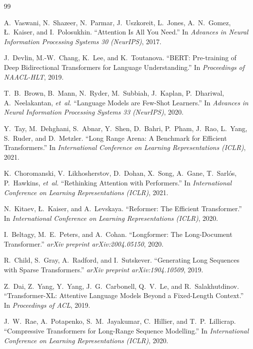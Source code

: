 \documentclass[12pt,a4paper,oneside]{book}
\begin{document}
\begin{thebibliography}{99}

A.~Vaswani, N.~Shazeer, N.~Parmar, J.~Uszkoreit, L.~Jones, A.~N.~Gomez, Ł.~Kaiser,
  and I.~Polosukhin.
``Attention Is All You Need.''
In \textit{Advances in Neural Information Processing Systems 30 (NeurIPS)}, 2017.

J.~Devlin, M.-W.~Chang, K.~Lee, and K.~Toutanova.
``BERT: Pre-training of Deep Bidirectional Transformers for Language Understanding.''
In \textit{Proceedings of NAACL-HLT}, 2019.

T.~B.~Brown, B.~Mann, N.~Ryder, M.~Subbiah, J.~Kaplan, P.~Dhariwal, A.~Neelakantan,
  \textit{et~al.}
``Language Models are Few-Shot Learners.''
In \textit{Advances in Neural Information Processing Systems 33 (NeurIPS)}, 2020.

Y.~Tay, M.~Dehghani, S.~Abnar, Y.~Shen, D.~Bahri, P.~Pham, J.~Rao, L.~Yang, S.~Ruder,
  and D.~Metzler.
``Long Range Arena: A Benchmark for Efficient Transformers.''
In \textit{International Conference on Learning Representations (ICLR)}, 2021.

K.~Choromanski, V.~Likhosherstov, D.~Dohan, X.~Song, A.~Gane, T.~Sarlós, P.~Hawkins,
  \textit{et~al.}
``Rethinking Attention with Performers.''
In \textit{International Conference on Learning Representations (ICLR)}, 2021.

N.~Kitaev, Ł.~Kaiser, and A.~Levskaya.
``Reformer: The Efficient Transformer.''
In \textit{International Conference on Learning Representations (ICLR)}, 2020.

I.~Beltagy, M.~E.~Peters, and A.~Cohan.
``Longformer: The Long-Document Transformer.''
\textit{arXiv preprint arXiv:2004.05150}, 2020.

R.~Child, S.~Gray, A.~Radford, and I.~Sutskever.
``Generating Long Sequences with Sparse Transformers.''
\textit{arXiv preprint arXiv:1904.10509}, 2019.

Z.~Dai, Z.~Yang, Y.~Yang, J.~G.~Carbonell, Q.~V.~Le, and R.~Salakhutdinov.
``Transformer-XL: Attentive Language Models Beyond a Fixed-Length Context.''
In \textit{Proceedings of ACL}, 2019.

J.~W.~Rae, A.~Potapenko, S.~M.~Jayakumar, C.~Hillier, and T.~P.~Lillicrap.
``Compressive Transformers for Long-Range Sequence Modelling.''
In \textit{International Conference on Learning Representations (ICLR)}, 2020.


\end{thebibliography}
\end{document}

